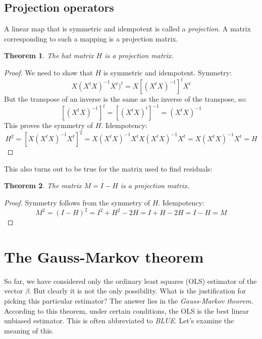 \documentclass[12pt, a4paper]{article}
\newtheorem{theorem}{Theorem}
\begin{document}
\subsection{Projection operators}
A linear map that is symmetric and idempotent is called a \textit{projection}. A matrix corresponding to such a mapping is a projection matrix.

\begin{theorem}
The hat matrix $H$ is a projection matrix.
\end{theorem}
\begin{proof}
We need to show that $H$ is symmetric and idempotent. Symmetry:
\begin{equation}
X(X^t X)^{-1}X^t)^t=X\left[(X^t X)^{-1}\right]^t X^t
\end{equation}
But the transpose of an inverse is the same as the inverse of the transpose, so:
\begin{equation}
\left[(X^t X)^{-1}\right]^t=\left[(X^t X)^t\right]^{-1}=(X^t X)^{-1}
\end{equation}
This proves the symmetry of $H$. Idempotency:
\begin{equation}
H^2=\left[X(X^t X)^{-1}X^t\right]^2=X(X^t X)^{-1}X^tX(X^t X)^{-1}X^t=X(X^t X)^{-1}X^t=H
\end{equation}
\end{proof}

This also turns out to be true for the matrix used to find residuals:

\begin{theorem}
The matrix $M=I-H$ is a projection matrix.
\end{theorem}
\begin{proof}
Symmetry follows from the symmetry of $H$. Idempotency:
\begin{equation}
M^2=(I-H)^2=I^2+H^2-2H=I+H-2H=I-H=M
\end{equation}
\end{proof}

\section{The Gauss-Markov theorem}
So far, we have considered only the ordinary least squares (OLS) estimator of the vector $\beta$. But clearly it is not the only possibility. What is the justification for picking this particular estimator? The answer lies in the \textit{Gauss-Markov theorem}. According to this theorem, under certain conditions, the OLS is the best linear unbiased estimator. This is often abbreviated to \textit{BLUE}. Let's examine the meaning of this.
\end{document}
